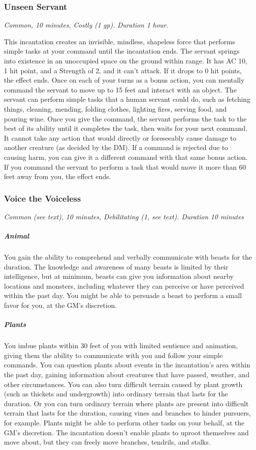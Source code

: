 \subsubsection{Unseen Servant}
\textit{Common, 10 minutes, Costly (1 gp). Duration 1 hour.}

This incantation creates an invisible, mindless, shapeless force that performs simple tasks at your command until the incantation ends. The servant springs into existence in an unoccupied space on the ground within range. It has AC 10, 1 hit point, and a Strength of 2, and it can't attack. If it drops to 0 hit points, the effect ends.
Once on each of your turns as a bonus action, you can mentally command the servant to move up to 15 feet and interact with an object. The servant can perform simple tasks that a human servant could do, such as fetching things, cleaning, mending, folding clothes, lighting fires, serving food, and pouring wine. Once you give the command, the servant performs the task to the best of its ability until it completes the task, then waits for your next command. It cannot take any action that would directly or foreseeably cause damage to another creature (as decided by the DM). If a command is rejected due to causing harm, you can give it a different command with that same bonus action.
If you command the servant to perform a task that would move it more than 60 feet away from you, the effect ends.

\subsubsection{Voice the Voiceless}
\textit{Common (see text), 10 minutes, Debilitating (1, see text). Duration 10 minutes}

\subparagraph*{Animal} You gain the ability to comprehend and verbally communicate with beasts for the duration. The knowledge and awareness of many beasts is limited by their intelligence, but at minimum, beasts can give you information about nearby locations and monsters, including whatever they can perceive or have perceived within the past day. You might be able to persuade a beast to perform a small favor for you, at the GM's discretion. 

\subparagraph*{Plants} You imbue plants within 30 feet of you with limited sentience and animation, giving them the ability to communicate with you and follow your simple commands. You can question plants about events in the incantation's area within the past day, gaining information about creatures that have passed, weather, and other circumstances.
You can also turn difficult terrain caused by plant growth (such as thickets and undergrowth) into ordinary terrain that lasts for the duration. Or you can turn ordinary terrain where plants are present into difficult terrain that lasts for the duration, causing vines and branches to hinder pursuers, for example. Plants might be able to perform other tasks on your behalf, at the GM's discretion. The incantation doesn't enable plants to uproot themselves and move about, but they can freely move branches, tendrils, and stalks.

